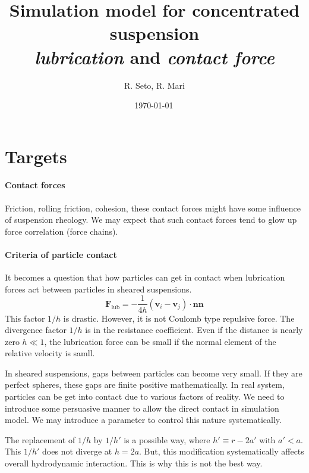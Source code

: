 \documentclass[12pt]{article}
\title{Simulation model for concentrated suspension\\
\emph{lubrication} and \emph{contact force}}
\date{\shortdate\today \, \ampmtime }
\author{R. Seto, R. Mari}
\begin{document}
\maketitle

\section{Targets}

\paragraph{Contact forces}

Friction, rolling friction, cohesion,
these contact forces might have some influence 
of suspension rheology.
%
We may expect that
such contact forces tend to glow up
force correlation (force chains).
%

\paragraph{Criteria of particle contact}

It becomes a question that how 
particles can get in contact 
when lubrication forces act between particles in sheared suspensions.
%
\begin{equation}
\bm{F}_{\mathrm{lub}} = -\frac{1}{4h} (\bm{v}_i-\bm{v}_j)\cdot\bm{n}\bm{n}
\end{equation}
%
This factor $1/h$ is drastic.
%
However, it is not Coulomb type repulsive force.
%
The divergence factor $1/h$
is in the resistance coefficient.
%
Even if the distance is nearly zero $h \ll 1$,
the lubrication force can be small
if the normal element of the relative velocity is samll.
%

In sheared suspensions,
gaps between particles can become very small.
%
If they are perfect spheres,
these gaps are finite positive mathematically.
%
In real system, particles can be get into contact
due to various factors of reality.
%
We need to introduce some persuasive manner 
to allow the direct contact in simulation model.
%
We may introduce a parameter to control this nature systematically.
%


The replacement of $1/h$ by $1/h'$ is a possible way,
where $h' \equiv r - 2a' $ with $a' < a$.
%
This $ 1/h'$ does not diverge at $h=2a$.
%
But, this modification systematically
affects overall hydrodynamic interaction.
%
This is why this is not the best way.
%
\end{document}
